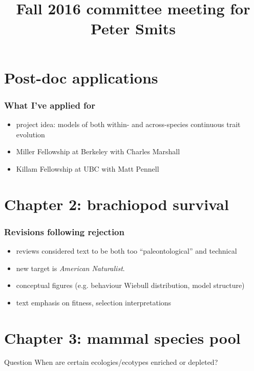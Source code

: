 \documentclass{beamer}
\title{Fall 2016 committee meeting for Peter Smits}
\author{}
\institute{}
\date{}
\begin{document}
\begin{frame}
  \maketitle
\end{frame}

\begin{frame}
  \tableofcontents
\end{frame}


\section{Post-doc applications}
\begin{frame}
  \frametitle{What I've applied for}
  \begin{itemize}
    \item project idea: models of both within- and across-species continuous trait evolution
    \item Miller Fellowship at Berkeley with Charles Marshall
    \item Killam Fellowship at UBC with Matt Pennell
  \end{itemize}
\end{frame}


\section{Chapter 2: brachiopod survival}
\begin{frame}
  \frametitle{Revisions following rejection}
  \begin{itemize}
    \item reviews considered text to be both too ``paleontological'' and technical
    \item new target is \textit{American Naturalist}.
    \item conceptual figures (e.g. behaviour Wiebull distribution, model structure)
    \item text emphasis on fitness, selection interpretations
  \end{itemize}
\end{frame}


\section{Chapter 3: mammal species pool}
\begin{frame}
  \begin{alertblock}{Question}
    When are certain ecologies/ecotypes enriched or depleted?
  \end{alertblock}
\end{frame}
\end{document}
